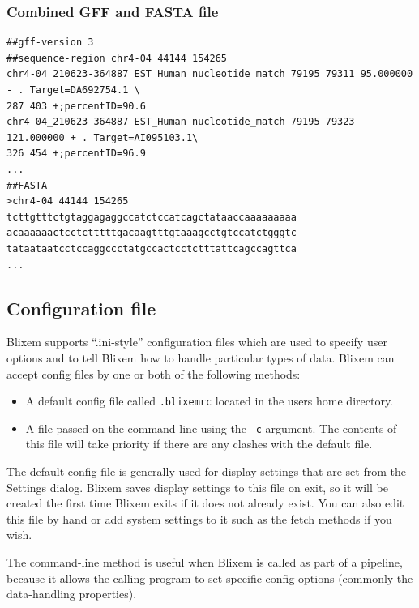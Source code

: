 \documentclass[letterpaper]{article}
\newcommand\textstyleSourceText[1]{\texttt{#1}}
\newcommand\liststyleLi{%
\renewcommand\labelitemi{{\textbullet}}
\renewcommand\labelitemii{{\textbullet}}
\renewcommand\labelitemiii{{\textbullet}}
\renewcommand\labelitemiv{{\textbullet}}
}
\begin{document}
{\color[rgb]{0.30980393,0.5058824,0.7411765}\subsubsection[Combined GFF and FASTA file]{Combined GFF and FASTA file}}

\begin{verbatim}
##gff-version 3
##sequence-region chr4-04 44144 154265
chr4-04_210623-364887 EST_Human nucleotide_match 79195 79311 95.000000 - . Target=DA692754.1 \
287 403 +;percentID=90.6
chr4-04_210623-364887 EST_Human nucleotide_match 79195 79323 121.000000 + . Target=AI095103.1\
326 454 +;percentID=96.9
...
##FASTA
>chr4-04 44144 154265
tcttgtttctgtaggagaggccatctccatcagctataaccaaaaaaaaa
acaaaaaactcctctttttgacaagtttgtaaagcctgtccatctgggtc
tataataatcctccaggccctatgccactcctctttattcagccagttca
...
\end{verbatim}

{\color[rgb]{0.30980393,0.5058824,0.7411765}\subsection[Configuration file]{Configuration file}}
{Blixem supports {\textquotedblleft}.ini-style{\textquotedblright}
configuration files which are used to specify user options and to tell
Blixem how to handle particular types of data. Blixem can accept
config files by one or both of the following methods:}

\liststyleLi
\begin{itemize}
\item {
A default config file called \textstyleSourceText{\textrm{.blixemrc}}
located in the user{\textquotesingle}s home directory. }
\item {
A file passed on the command-line using the
\textstyleSourceText{\textrm{{}-c}} argument. The contents of this file
will take priority if there are any clashes with the default file. }
\end{itemize}

{The default config file is generally used for display settings that are
set from the Settings dialog. Blixem saves display settings to this
file on exit, so it will be created the first time Blixem exits if it
does not already exist. You can also edit this file by hand or add
system settings to it such as the fetch methods if you wish. }

\bigskip

{The command-line method is useful when Blixem is called as part of a
pipeline, because it allows the calling program to set specific config
options (commonly the data-handling properties). }
\end{document}
